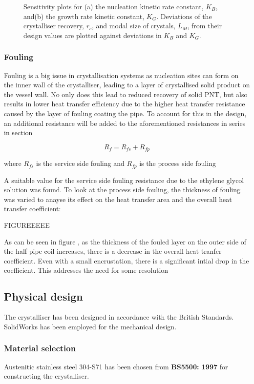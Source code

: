 \begin{figure}[h]
    \centering
    
    \caption{Sensitivity plots for (a) the nucleation kinetic rate constant, $K_B$, and(b) the growth rate kinetic constant, $K_G$. Deviations of the crystalliser recovery, $r_c$, and modal size of crystals, $L_M$, from their design values are plotted against deviations in $K_B$ and $K_G$. }
    \label{fig:sensitivity kinetics}
\end{figure}
   
\subsubsection{Fouling}\label{sec:fouling}

Fouling is a big issue in crystallisation systems as nucleation sites can form on the inner wall of the crystalliser, leading to a layer of crystallised solid product on the vessel wall. No only does this lead to reduced recovery of solid PNT, but also results in lower heat transfer efficiency due to the higher heat transfer resistance caused by the layer of fouling coating the pipe. To account for this in the  design, an additional resistance will be added to the aforementioned resistances in series in section %


\begin{equation} \label{eq:fouling}
    R_f = R_{fs} + R_{fp}
    \end{equation}
    
    where $R_{fs}$ is the service side fouling and $R_{fp}$ is the process side fouling 

A suitable value for the service side fouling resistance due to the ethylene glycol solution was found. To look at the process side fouling, the thickness of fouling was varied to anayse its effect on the heat transfer area and the overall heat transfer coefficient:

FIGUREEEEE

As can be seen in figure 
, as the thickness of the fouled layer on the outer side of the half pipe coil increases, there is a decrease in the overall heat tranfer coefficient. Even with a small encrustation, there is a significant intial drop in the coefficient. This addresses the need for some resolution 



\subsection{Physical design}

The crystalliser has been designed in accordance with the British Standards.  SolidWorks\textsuperscript{\textregistered} has been employed for the mechanical design. 

\subsubsection{Material selection}

Austenitic stainless steel 304-S71 has been chosen from \textbf{BS5500: 1997} for constructing the crystalliser. 



